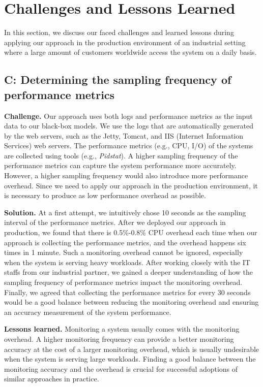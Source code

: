 \section{Challenges and Lessons Learned} \label{sec:challenges}
In this section, we discuss our faced challenges and learned lessons during applying our approach in the production environment of an industrial setting where a large amount of customers worldwide access the system on a daily basis.

\setcounter{ChallengeCount}{0}

\subsection*{C: Determining the sampling frequency of performance metrics}
\noindent\textbf{Challenge.}
Our approach uses both logs and performance metrics as the input data to our black-box models. We use the logs that are automatically generated by the web servers, such as the Jetty, Tomcat, and IIS (Internet Information Services) web servers. 
The performance metrics (e.g., CPU, I/O) of the systems are collected using tools (e.g., \emph{Pidstat}).
A higher sampling frequency of the performance metrics can capture the system performance more accurately. However, a higher sampling frequency would also introduce more performance overhead. Since we need to apply our approach in the production environment, it is necessary to produce as low performance overhead as possible.

\noindent\textbf{Solution.}
At a first attempt, we intuitively chose 10 seconds as the sampling interval of the performance metrics. After we deployed our approach in production, we found that there is 0.5\%-0.8\% CPU overhead each time when our approach is collecting the performance metrics, and the overhead happens six times in 1 minute. Such a monitoring overhead cannot be ignored, especially when the system is serving heavy workloads. After working closely with the IT staffs from our industrial partner, we gained a deeper understanding of how the sampling frequency of performance metrics impact the monitoring overhead. Finally, we agreed that collecting the performance metrics for every 30 seconds would be a good balance between reducing the monitoring overhead and ensuring an accuracy measurement of the system performance.

\noindent\textbf{Lessons learned.}
Monitoring a system usually comes with the monitoring overhead.
A higher monitoring frequency can provide a better monitoring accuracy at the cost of a larger monitoring overhead, which is usually undesirable when the system is serving large workloads.
Finding a good balance between the monitoring accuracy and the overhead is crucial for successful adoptions of similar approaches in practice.


